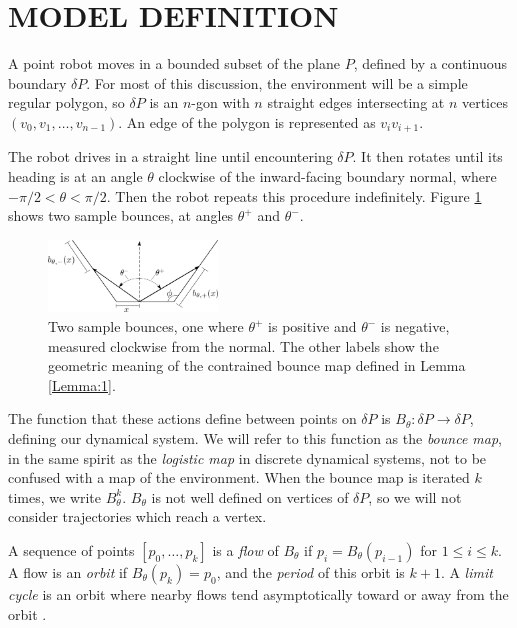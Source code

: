 \documentclass[letterpaper, 10 pt, conference]{ieeeconf}  %
\begin{document}
\section{MODEL DEFINITION\label{model}}

A point robot moves in a bounded subset of the plane $P$,
defined by a continuous boundary $\delta P$. For most 
of this discussion, the environment will be a simple regular polygon, so $\delta P$ 
is an $n$-gon with $n$ straight edges intersecting at $n$ vertices
$(v_0, v_1, \ldots, v_{n-1})$.  An edge of the polygon is represented as $v_i
v_{i+1}$.

The robot drives in a straight line until encountering $\delta P$. It then rotates
until its heading is at an angle $\theta$ clockwise of the inward-facing boundary
normal, where $-\pi/2 < \theta < \pi/2$. Then the robot repeats this procedure
indefinitely. Figure \ref{bounce_def} shows two sample bounces, at
angles $\theta^+$ and $\theta^-$.

\begin{figure}[thpb]
  \centering
  \includegraphics[width=0.4\textwidth]{../figs/bounce_def.pdf}
  \caption{Two sample bounces, one where $\theta^+$ is positive and $\theta^-$
is negative, measured clockwise from the normal. The other labels show the geometric meaning of the
contrained bounce map defined in Lemma \ref{Lemma:1}.}
  \label{bounce_def}
\end{figure}

The function that these actions define between points
on $\delta P$ is $B_{\theta}: \delta P \to \delta P$, defining our dynamical system.
We will refer to this function as the \textit{bounce map}, in the same spirit as
the \textit{logistic map} in discrete dynamical systems, not to be confused with
a map of the environment.
When the bounce map is iterated $k$ times, we write $B^k_{\theta}$.
$B_{\theta}$ is not well defined
on vertices of $\delta P$, so we will not consider trajectories which reach a
vertex.

A sequence of points $[p_0, \ldots, p_k]$ is a \textit{flow} of $B_{\theta}$ if
$p_i = B_{\theta}(p_{i-1})$ for $1 \leq i \leq k$. A flow is an \textit{orbit} if
$B_{\theta}(p_k) = p_0$, and the \textit{period} of this orbit is $k+1$. A \textit{limit
cycle} is an orbit where nearby flows tend asymptotically toward or away from
the orbit \cite{jackson1992}.
\end{document}
